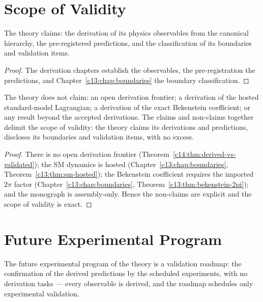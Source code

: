 \section{Scope of Validity}
\label{c14:sec:scope}

\begin{theorem}
\label{c14:thm:claims}
The theory claims: the derivation of its physics observables from the canonical hierarchy,
the pre-registered predictions, and the classification of its boundaries and validation
items.
\end{theorem}

\begin{proof}
The derivation chapters establish the observables, the pre-registration \cite{c14:QG190} the
predictions, and Chapter~\ref{c13:chap:boundaries} the boundary classification.
\end{proof}

\begin{theorem}
\label{c14:thm:non-claims-scope}
The theory does not claim: an open derivation frontier; a derivation of the hosted
standard-model Lagrangian; a derivation of the exact Bekenstein coefficient; or any result
beyond the accepted derivations. The claims and non-claims together delimit the scope of
validity: the theory claims its derivations and predictions, discloses its boundaries and
validation items, with no excess.
\end{theorem}

\begin{proof}
There is no open derivation frontier (Theorem~\ref{c14:thm:derived-vs-validated}); the SM
dynamics is hosted (Chapter~\ref{c13:chap:boundaries}, Theorem~\ref{c13:thm:sm-hosted}); the
Bekenstein coefficient requires the imported $2\pi$ factor (Chapter~\ref{c13:chap:boundaries},
Theorem~\ref{c13:thm:bekenstein-2pi}); and the monograph is assembly-only. Hence the
non-claims are explicit and the scope of validity is exact.
\end{proof}

\section{Future Experimental Program}
\label{c14:sec:future-program}

\begin{theorem}
\label{c14:thm:validation-roadmap}
The future experimental program of the theory is a validation roadmap: the confirmation of
the derived predictions by the scheduled experiments, with no derivation tasks --- every
observable is derived, and the roadmap schedules only experimental validation.
\end{theorem}

